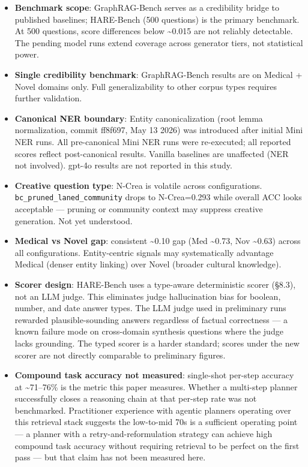 \begin{itemize}
\tightlist
\item
  \textbf{Benchmark scope}: GraphRAG-Bench serves as a credibility bridge to published baselines; HARE-Bench (500 questions) is the primary benchmark. At 500 questions, score differences below \textasciitilde0.015 are not reliably detectable. The pending model runs extend coverage across generator tiers, not statistical power.
\item
  \textbf{Single credibility benchmark}: GraphRAG-Bench results are on Medical + Novel domains only. Full generalizability to other corpus types requires further validation.
\item
  \textbf{Canonical NER boundary}: Entity canonicalization (root lemma normalization, commit ff8f697, May 13 2026) was introduced after initial Mini NER runs. All pre-canonical Mini NER runs were re-executed; all reported scores reflect post-canonical results. Vanilla baselines are unaffected (NER not involved). gpt-4o results are not reported in this study.
\item
  \textbf{Creative question type}: N-Crea is volatile across configurations. \texttt{bc\_pruned\_laned\_community} drops to N-Crea=0.293 while overall ACC looks acceptable --- pruning or community context may suppress creative generation. Not yet understood.
\item
  \textbf{Medical vs Novel gap}: consistent \textasciitilde0.10 gap (Med \textasciitilde0.73, Nov \textasciitilde0.63) across all configurations. Entity-centric signals may systematically advantage Medical (denser entity linking) over Novel (broader cultural knowledge).
\item
  \textbf{Scorer design}: HARE-Bench uses a type-aware deterministic scorer (§8.3), not an LLM judge. This eliminates judge hallucination bias for boolean, number, and date answer types. The LLM judge used in preliminary runs rewarded plausible-sounding answers regardless of factual correctness --- a known failure mode on cross-domain synthesis questions where the judge lacks grounding. The typed scorer is a harder standard; scores under the new scorer are not directly comparable to preliminary figures.
\item
  \textbf{Compound task accuracy not measured}: single-shot per-step accuracy at \textasciitilde71--76\% is the metric this paper measures. Whether a multi-step planner successfully closes a reasoning chain at that per-step rate was not benchmarked. Practitioner experience with agentic planners operating over this retrieval stack suggests the low-to-mid 70s is a sufficient operating point --- a planner with a retry-and-reformulation strategy can achieve high compound task accuracy without requiring retrieval to be perfect on the first pass --- but that claim has not been measured here.

\end{itemize}
